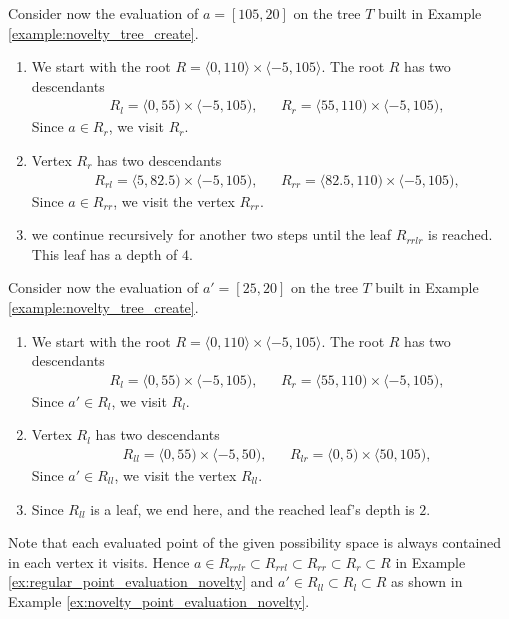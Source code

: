 \begin{example}
\label{ex:regular_point_evaluation_novelty}
    Consider now the evaluation of $a = [105,20]$ on the tree $T$ built in Example \ref{example:novelty_tree_create}.

\begin{enumerate}
    \item  We start with the root $R = \langle 0,110\rangle \times \langle -5, 105 \rangle$.
    The root $R$ has two descendants 
\begin{align*}
    &R_l = \langle 0,55) \times \langle -5, 105),&
    &R_r = \langle 55,110) \times \langle -5, 105),
\end{align*}
Since $a \in R_r$, we visit $R_r$.
\item Vertex $R_r$ has two descendants
\begin{align*}
    &R_{rl} = \langle 5,82.5) \times \langle -5, 105),&
    &R_{rr} = \langle 82.5,110) \times \langle -5, 105),
\end{align*}
Since $a \in R_{rr}$, we visit the vertex $R_{rr}$.
\item
we continue recursively for another two steps until the leaf $R_{rrlr}$ is reached. This leaf has a depth of $4$.

\end{enumerate}
   
\end{example}

\begin{example}
\label{ex:novelty_point_evaluation_novelty}
    Consider now the evaluation of $a' = [25,20]$ on the tree $T$ built in Example \ref{example:novelty_tree_create}.

\begin{enumerate}
    \item  We start with the root $R = \langle 0,110\rangle \times \langle -5, 105 \rangle$.
    The root $R$ has two descendants 
\begin{align*}
    &R_l = \langle 0,55) \times \langle -5, 105),&
    &R_r = \langle 55,110) \times \langle -5, 105),
\end{align*}
Since $a' \in R_l$, we visit $R_l$.
\item Vertex $R_l$ has two descendants
\begin{align*}
    &R_{ll} = \langle 0,55) \times \langle -5, 50),&
    &R_{lr} = \langle 0,5) \times \langle 50, 105),
\end{align*}
Since $a' \in R_{ll}$, we visit the vertex $R_{ll}$.
\item
Since $R_{ll}$ is a leaf, we end here, and the reached leaf's depth is $2$.
\end{enumerate}
\end{example}
Note that each evaluated point of the given possibility space is always contained in each vertex it visits.
Hence $a \in R_{rrlr} \subset R_{rrl} \subset R_{rr} \subset R_{r} \subset R$ in Example \ref{ex:regular_point_evaluation_novelty}
and $a' \in R_{ll} \subset R_{l} \subset R$ as shown in Example \ref{ex:novelty_point_evaluation_novelty}.


